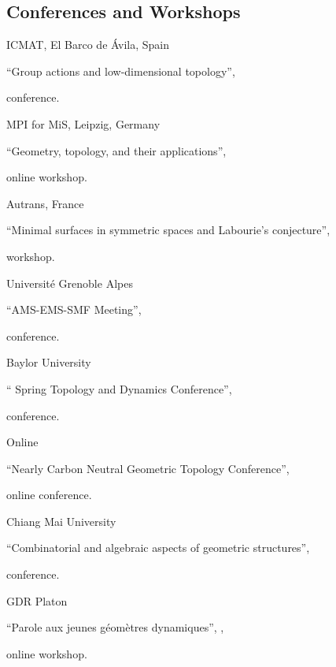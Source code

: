 
\subsection{Conferences and Workshops}

{ICMAT, El Barco de {\'A}vila, Spain}
{``Group actions and low-dimensional topology'', \begin{footnotesize}
		conference.
	\end{footnotesize}}
{}

{MPI for MiS, Leipzig, Germany}
{``Geometry, topology, and their applications'', \begin{footnotesize}
		online workshop.
\end{footnotesize}}
{}

{Autrans, France}
{``Minimal surfaces in symmetric spaces and Labourie's conjecture'', \begin{footnotesize}
		workshop.
	\end{footnotesize}}
{}

{Universit\'e Grenoble Alpes}
{``AMS-EMS-SMF Meeting'', \begin{footnotesize}
		conference.
	\end{footnotesize}}
{}

{Baylor University}
{`` Spring Topology and Dynamics Conference'', \begin{footnotesize}
		conference.
	\end{footnotesize}}
{}

{Online}
{``Nearly Carbon Neutral Geometric Topology Conference'', \begin{footnotesize}
		online conference.
	\end{footnotesize}}
{}

{Chiang Mai University}
{``Combinatorial and algebraic aspects of geometric structures'', \begin{footnotesize}
		conference.
	\end{footnotesize}}
{}

{GDR Platon}
{``Parole aux jeunes g\'eom\`etres dynamiques'', , \begin{footnotesize}
		online workshop.
	\end{footnotesize}}
{}

